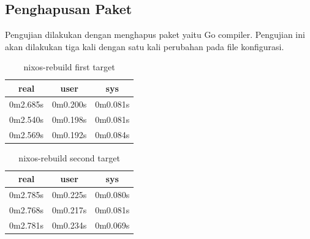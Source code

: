 \documentclass[10pt,]{report}
\begin{document}
\begin{adjustwidth}{20pt}{}
	\subsection{Penghapusan Paket}
	\begin{adjustwidth}{20pt}{}
		Pengujian dilakukan dengan menghapus paket yaitu Go compiler.
		Pengujian ini akan dilakukan tiga kali dengan satu kali perubahan pada file
		konfigurasi.
	\end{adjustwidth}
	\begin{table}[H]
		\begin{center}
			\begin{tabular}[c]{|c|c|c|}
				\hline
				\multicolumn{1}{|c|}{\textbf{real}} &
				\multicolumn{1}{c|}{\textbf{user}}  &
				\multicolumn{1}{c|}{\textbf{sys}}                         \\
				\hline
				0m2.685s                            & 0m0.200s & 0m0.081s \\
				\hline
				0m2.540s                            & 0m0.198s & 0m0.081s \\
				\hline
				0m2.569s                            & 0m0.192s & 0m0.084s \\
				\hline
			\end{tabular}
		\end{center}
		\caption{nixos-rebuild first target}
	\end{table}
	\begin{table}[H]
		\begin{center}
			\begin{tabular}[c]{|c|c|c|}
				\hline
				\multicolumn{1}{|c|}{\textbf{real}} &
				\multicolumn{1}{c|}{\textbf{user}}  &
				\multicolumn{1}{c|}{\textbf{sys}}                         \\
				\hline
				0m2.785s                            & 0m0.225s & 0m0.080s \\
				\hline
				0m2.768s                            & 0m0.217s & 0m0.081s \\
				\hline
				0m2.781s                            & 0m0.234s & 0m0.069s \\
				\hline
			\end{tabular}
		\end{center}
		\caption{nixos-rebuild second target}
	\end{table}
\end{adjustwidth}

\printbibliography[title={DAFTAR PUSTAKA}]
\end{document}
